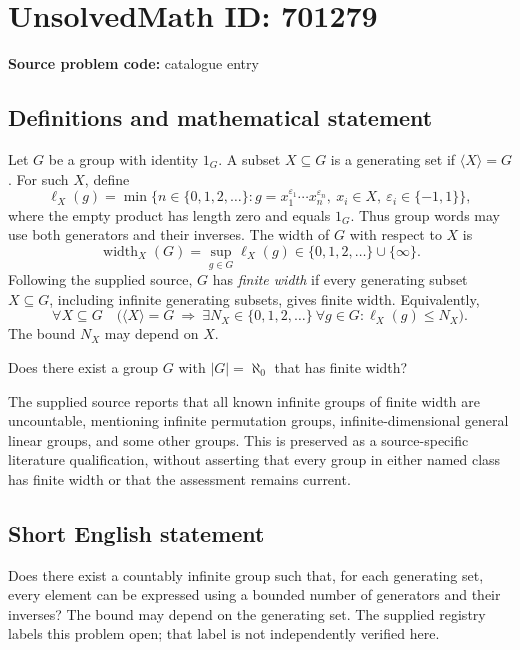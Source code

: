 \documentclass[11pt]{article}
\begin{document}
\section*{UnsolvedMath ID: 701279}
\textbf{Source problem code:} catalogue entry
\subsection{Definitions and mathematical statement}
Let \(G\) be a group with identity \(1_G\). A subset \(X\subseteq G\) is a generating set if \(\langle X\rangle=G\). For such \(X\), define
\[
\ell_X(g)=\min\bigl\{n\in\{0,1,2,\ldots\}:g=x_1^{\varepsilon_1}\cdots x_n^{\varepsilon_n},\ x_i\in X,\ \varepsilon_i\in\{-1,1\}\bigr\},
\]
where the empty product has length zero and equals \(1_G\). Thus group words may use both generators and their inverses. The width of \(G\) with respect to \(X\) is
\[
\operatorname{width}_X(G)=\sup_{g\in G}\ell_X(g)\in\{0,1,2,\ldots\}\cup\{\infty\}.
\]
Following the supplied source, \(G\) has \emph{finite width} if every generating subset \(X\subseteq G\), including infinite generating subsets, gives finite width. Equivalently,
\[
\forall X\subseteq G\quad\bigl(\langle X\rangle=G\ \Longrightarrow\ \exists N_X\in\{0,1,2,\ldots\}\ \forall g\in G:\ell_X(g)\leq N_X\bigr).
\]
The bound \(N_X\) may depend on \(X\).

Does there exist a group \(G\) with \(|G|=\aleph_0\) that has finite width?

The supplied source reports that all known infinite groups of finite width are uncountable, mentioning infinite permutation groups, infinite-dimensional general linear groups, and some other groups. This is preserved as a source-specific literature qualification, without asserting that every group in either named class has finite width or that the assessment remains current.
\subsection{Short English statement}
Does there exist a countably infinite group such that, for each generating set, every element can be expressed using a bounded number of generators and their inverses? The bound may depend on the generating set. The supplied registry labels this problem open; that label is not independently verified here.
\end{document}
